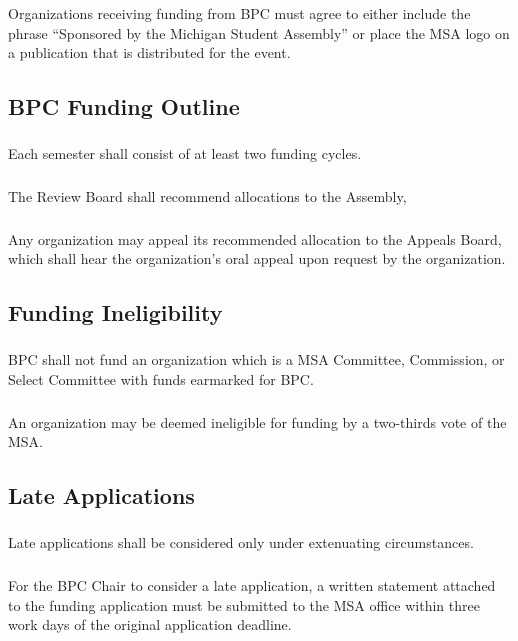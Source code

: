\subsubsubsection{}
Organizations receiving funding from BPC must agree to either include the phrase “Sponsored by the Michigan Student Assembly” or place the MSA logo on a publication that is distributed for the event.


\subsection{BPC Funding Outline}
\subsubsection{}
Each semester shall consist of at least two funding cycles.
\subsubsection{}
The Review Board shall recommend allocations to the Assembly,
\subsubsection{}
Any organization may appeal its recommended allocation to the Appeals Board, which shall hear the organization's oral appeal upon request by the organization. 

\subsection{Funding Ineligibility}
\subsubsection{}
BPC shall not fund an organization which is a MSA Committee, Commission, or Select Committee with funds earmarked for BPC.  
\subsubsection{}
An organization may be deemed ineligible for funding by a two-thirds vote of the MSA.

\subsection{Late Applications}
\subsubsection{}
Late applications shall be considered only under extenuating circumstances.
\subsubsection{}
For the BPC Chair to consider a late application, a written statement attached to the funding application must be submitted to the MSA office within three work days of the original application deadline.

